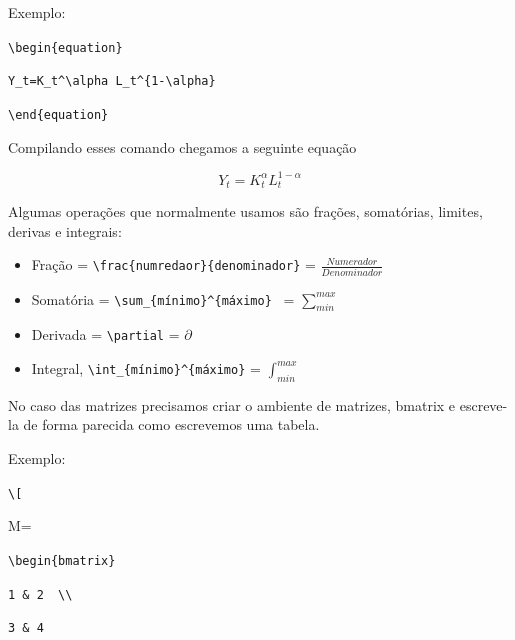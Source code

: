 \documentclass[12pt,oneside,a4paper,chapter=TITLE,english,brazil,sumario=abnt-6027-2012]{abntex2}
\begin{document}
\vspace{0.2cm}

Exemplo:

\vspace{0.2cm}

\verb|\begin{equation}|

\verb|Y_t=K_t^\alpha L_t^{1-\alpha}|

\verb|\end{equation}|

\vspace{0.2cm}

Compilando esses comando chegamos a seguinte equação

\vspace{0.2cm}

\begin{equation}\label{equ1}
	Y_t=K_t^\alpha L_t^{1-\alpha}
\end{equation}

Algumas operações que normalmente usamos são frações, somatórias, limites, derivas e integrais:

\begin{itemize}
	\item Fração = \verb|\frac{numredaor}{denominador}| = $\frac{Numerador}{Denominador}$
	      
	\item Somatória = \verb|\sum_{mínimo}^{máximo} | = $\sum_{min}^{max}$
	      
	\item Derivada = \verb|\partial| = $\partial$
	      
	\item Integral, \verb|\int_{mínimo}^{máximo}| = $\int_{min}^{max}$
	      
\end{itemize}

No caso das matrizes precisamos criar o ambiente de matrizes, bmatrix e escreve-la de forma parecida como escrevemos uma tabela.

\vspace{0.2cm}
Exemplo: 
\vspace{0.2cm}

\verb|\[|

M=

\verb|\begin{bmatrix}|

\verb|1 & 2  \\|

\verb|3 & 4 |
\end{document}
